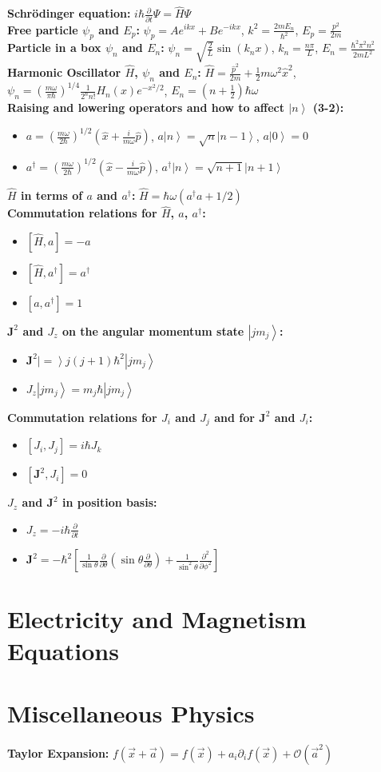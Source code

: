 \documentclass[12pt]{extarticle}
\newcommand{\ket}[1]{\left| #1 \right>}
\begin{document}
\textbf{Schr\"odinger equation:} $i\hbar\frac{\partial}{\partial t} \Psi = \hat{H} \Psi$ \\
\textbf{Free particle $\psi_p$ and $E_p$:} $\psi_p = Ae^{ikx}+Be^{-ikx}$, $k^2=\frac{2mE_n}{\hbar^2}$, $E_p = \frac{p^2}{2m}$ \\
\textbf{Particle in a box $\psi_n$ and $E_n$:} $\psi_n = \sqrt{\frac{2}{L}}\sin{(k_nx)}$, $k_n = \frac{n\pi}{L}$, $E_n = \frac{\hbar^2\pi^2n^2}{2mL^2}$ \\
\textbf{Harmonic Oscillator $\hat{H}$, $\psi_n$ and $E_n$:} $\hat{H} = \frac{\hat{p}^2}{2m} + \frac{1}{2}m\omega^2\hat{x}^2$, $\psi_n = \left(\frac{m\omega}{\pi\hbar}\right)^{1/4}\frac{1}{2^nn!}H_n(x)e^{-x^2/2}$, $E_n = (n+\frac{1}{2})\hbar\omega$ \\
\textbf{Raising and lowering operators and how to affect $\ket{n}$ (3-2):}
\begin{itemize}
  \item $a = \left(\frac{m\omega}{2\hbar}\right)^{1/2}\left(\hat{x}+\frac{i}{m\omega}\hat{p}\right)$, $a\ket{n} = \sqrt{n}\ket{n-1}$, $a\ket{0} = 0$
  \item $a^\dagger = \left(\frac{m\omega}{2\hbar}\right)^{1/2}\left(\hat{x}-\frac{i}{m\omega}\hat{p}\right)$, $a^\dagger\ket{n} = \sqrt{n+1}\ket{n+1}$
\end{itemize}
\textbf{$\hat{H}$ in terms of $a$ and $a^\dagger$:} $\hat{H} = \hbar\omega (a^\dagger a + 1/2)$ \\
\textbf{Commutation relations for $\hat{H}$, $a$, $a^\dagger$:}
\begin{itemize}
  \item $[ \hat{H}, a ] = -a$
  \item $[ \hat{H}, a^\dagger ] = a^\dagger$
  \item $[ a, a^\dagger ] = 1$
\end{itemize}
\textbf{$\mathbf{J}^2$ and $J_z$ on the angular momentum state $\ket{jm_j}$:}
\begin{itemize}
  \item $\mathbf{J}^2\ket = j(j+1)\hbar^2\ket{jm_j}$
  \item $J_z\ket{jm_j} = m_j\hbar\ket{jm_j}$
\end{itemize}
\textbf{Commutation relations for $J_i$ and $J_j$ and for $\mathbf{J}^2$ and $J_i$:}
\begin{itemize}
  \item $[J_i, J_j] = i\hbar J_k$
  \item $[\mathbf{J}^2, J_i] = 0$
\end{itemize}
\textbf{$J_z$ and $\mathbf{J}^2$ in position basis:}
\begin{itemize}
  \item $J_z = -i\hbar \frac{\partial}{\partial t}$
  \item $\mathbf{J}^2 = -\hbar^2\left[ \frac{1}{\sin\theta}\frac{\partial}{\partial\theta}\left(\sin\theta\frac{\partial}{\partial\theta}\right) + \frac{1}{\sin^2\theta}\frac{\partial^2}{\partial\phi^2} \right]$
\end{itemize}

\section{Electricity and Magnetism Equations}

\section{Miscellaneous Physics}
\textbf{Taylor Expansion:} $f(\vec{x}+\vec{a}) = f(\vec{x}) + a_i\partial_i f(\vec{x}) + \mathcal{O}(\vec{a}^2)$
\end{document}
